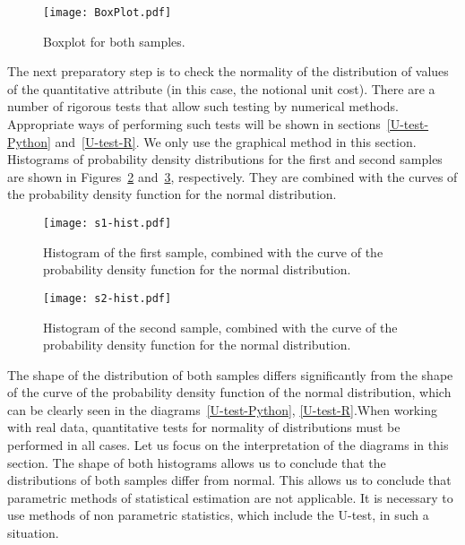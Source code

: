 \documentclass[]{scrreprt}
\begin{document}
%
\begin{figure}[htp]
	\centering
	\texttt{[image: BoxPlot.pdf]}
	\caption{Boxplot for both samples.}
	\label{fig:BoxPlot}
\end{figure}
%
The next preparatory step is to check the normality of the distribution of values of the quantitative attribute (in this case, the notional unit cost). There are a number of rigorous tests that allow such testing by numerical methods. Appropriate ways of performing such tests will be shown in sections~\ref{U-test-Python} and~\ref{U-test-R}. We only use the graphical method in this section. Histograms of probability density distributions for the first and second samples are shown in Figures~\ref{fig:s1-hist} and~\ref{fig:s2-hist}, respectively. They are combined with the curves of the probability density function for the normal distribution.
%
\begin{figure}[htp]
	\centering
	\texttt{[image: s1-hist.pdf]}
	\caption{Histogram of the first sample, combined with the curve of the probability density function for the normal distribution.}
	\label{fig:s1-hist}
\end{figure}
%
\begin{figure}[htp]
	\centering
	\texttt{[image: s2-hist.pdf]}
	\caption{Histogram of the second sample, combined with the curve of the probability density function for the normal distribution.}
	\label{fig:s2-hist}
\end{figure}
%

The shape of the distribution of both samples differs significantly from the shape of the curve of the probability density function of the normal distribution, which can be clearly seen in the diagrams~\ref{U-test-Python}, \ref{U-test-R}.When working with real data, quantitative tests for normality of distributions must be performed in all cases. Let us focus on the interpretation of the diagrams in this section. The shape of both histograms allows us to conclude that the distributions of both samples differ from normal. This allows us to conclude that parametric methods of statistical estimation are not applicable. It is necessary to use methods of non parametric statistics, which include the U-test, in such a situation.
\end{document}
